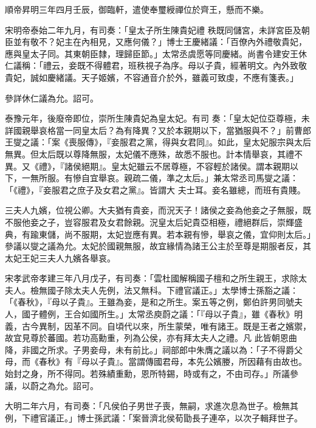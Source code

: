 \begin{pinyinscope}
 順帝昇明三年四月壬辰，御臨軒，遣使奉璽綬禪位於齊王，懸而不樂。



 宋明帝泰始二年九月，有司奏：「皇太子所生陳貴妃禮
 秩既同儲宮，未詳宮臣及朝臣並有敬不？妃主在內相見，又應何儀？」博士王慶緒議：「百僚內外禮敬貴妃，應與皇太子同。其東朝臣隸，理歸臣節。」太常丞虞愿等同慶緒。尚書令建安王休仁議稱：「禮云，妾既不得體君，班秩視子為序。母以子貴，經著明文。內外致敬貴妃，誠如慶緒議。天子姬嬪，不容通音介於外，雖義可致虔，不應有箋表。」



 參詳休仁議為允。詔可。



 泰豫元年，後廢帝即位，崇所生陳貴妃為皇太妃。有司
 奏：「皇太妃位亞尊極，未詳國親舉哀格當一同皇太后？為有降異？又於本親期以下，當猶服與不？」前曹郎王燮之議：「案《喪服傳》，『妾服君之黨，得與女君同』。如此，皇太妃服宗與太后無異。但太后既以尊降無服，太妃儀不應殊，故悉不服也。計本情舉哀，其禮不異。又《禮》，『諸侯絕期』。皇太妃雖云不居尊極，不容輕於諸侯。謂本親期以下，一無所服。有慘自宜舉哀。親疏二儀，準之太后。」兼太常丞司馬燮之議：「《禮》，『妾服君之庶子及女君之黨』。皆謂大
 夫士耳。妾名雖總，而班有貴賤。



 三夫人九嬪，位視公卿。大夫猶有貴妾，而況天子！諸侯之妾為他妾之子無服，既不服他妾之子，豈容服君及女君餘親。況皇太后妃貴亞相極，禮絕群后，崇輝盛典，有踰東儲，尚不服期，太妃豈應有異。若本親有慘，舉哀之儀，宜仰則太后。」參議以燮之議為允。太妃於國親無服，故宜緣情為諸王公主於至尊是期服者反，其太妃王妃三夫人九嬪各舉哀。



 宋孝武帝孝建三年八月戊子，有司奏：「雲杜國解稱國子檀和之所生親王，求除太夫人。檢無國子除太夫人先例，法又無科。下禮官議正。」太學博士孫豁之議：「《春秋》，『母以子貴』。王雖為妾，是和之所生。案五等之例，鄭伯許男同號夫人，國子體例，王合如國所生。」太常丞庾蔚之議：「『母以子貴』，雖《春秋》明義，古今異制，因革不同。自頃代以來，所生蒙榮，唯有諸王。既是王者之嬪禦，故宜見尊於蕃國。若功高勳重，列為公侯，亦有拜太夫人之禮。凡
 此皆朝恩曲降，非國之所求。子男妾母，未有前比。」祠部郎中朱膺之議以為：「子不得爵父母，而《春秋》有『母以子貴』。當謂傳國君母，本先公嬪媵，所因藉有由故也。始封之身，所不得同。若殊績重勳，恩所特錫，時或有之，不由司存。」所議參議，以蔚之為允。詔可。



 大明二年六月，有司奏：「凡侯伯子男世子喪，無嗣，求進次息為世子。檢無其例，下禮官議正。」博士孫武議：「案晉濟北侯荀勖長子連卒，以次子輯拜世子。




\end{pinyinscope}
